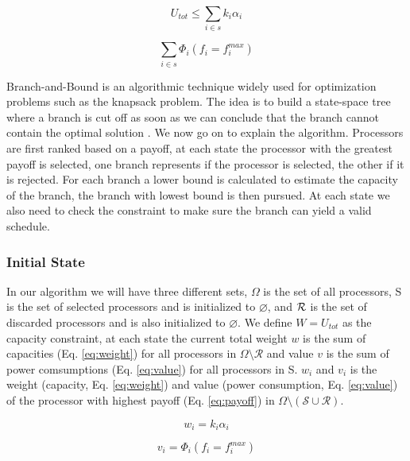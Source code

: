 \documentclass[conference]{IEEEtran}
\begin{document}
\begin{equation} \label{eq:cweight}
	U_{tot} \leq \sum_{i \in s} k_i \alpha_i
\end{equation}

\begin{equation} \label{eq:tvalue}
	\sum_{i \in s} \Phi_{i}(f_{i}=f^{max}_{i})
\end{equation}

Branch-and-Bound is an algorithmic technique widely used for optimization problems such as the knapsack problem. The idea is to build a state-space tree where a branch is cut off as soon as we can conclude that the branch cannot contain the optimal solution \cite{Levitin06}. We now go on to explain the algorithm. Processors are first ranked based on a payoff, at each state the processor with the greatest payoff is selected, one branch represents if the processor is selected, the other if it is rejected. For each branch a lower bound is calculated to estimate the capacity of the branch, the branch with lowest bound is then pursued. At each state we also need to check the constraint to make sure the branch can yield a valid schedule.

\subsubsection{Initial State}
In our algorithm we will have three different sets, $\Omega$ is the set of all processors, {\cal S} is the set of selected processors and is initialized to $\varnothing$, and ${\cal R}$ is the set of discarded processors and is also initialized to $\varnothing$. We define $W = U_{tot}$ as the capacity constraint, at each state the current total weight $w$ is the sum of capacities (Eq. \ref{eq:weight}) for all processors in $\Omega \setminus \mathcal{R}$ and value $v$ is the sum of power comsumptions (Eq. \ref{eq:value}) for all processors in {\cal S}. $w_i$ and $v_i$ is the weight (capacity, Eq. \ref{eq:weight}) and value (power consumption, Eq. \ref{eq:value}) of the processor with highest payoff (Eq. \ref{eq:payoff}) in $\Omega \setminus (\mathcal{S} \cup \mathcal{R})$.

\begin{equation} \label{eq:weight}
	w_{i} = k_{i} \alpha_{i}
\end{equation}

\begin{equation} \label{eq:value}
	v_{i} = \Phi_{i}(f_{i}=f^{max}_{i})
\end{equation}
\end{document}
